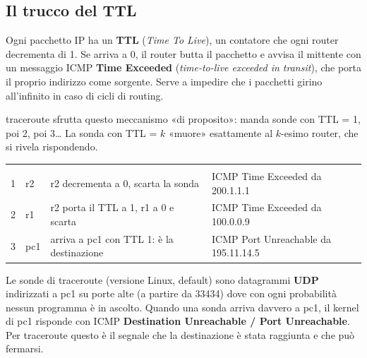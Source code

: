 \subsection{Il trucco del TTL}
\begin{intuizione}
Ogni pacchetto IP ha un \textbf{TTL} (\emph{Time To Live}), un contatore che ogni router decrementa di 1. Se arriva a 0, il router butta il pacchetto e avvisa il mittente con un messaggio ICMP \textbf{Time Exceeded} (\emph{time-to-live exceeded in transit}), che porta il proprio indirizzo come sorgente. Serve a impedire che i pacchetti girino all'infinito in caso di cicli di routing.

traceroute sfrutta questo meccanismo «di proposito»: manda sonde con TTL = 1, poi 2, poi 3\dots{} La sonda con TTL = $k$ «muore» esattamente al $k$-esimo router, che si rivela rispondendo.
\end{intuizione}
\begin{center}
\begin{tabularx}{\linewidth}{c l Y l}
 &  &  & \\
1 & r2 & r2 decrementa a 0, scarta la sonda & ICMP Time Exceeded da 200.1.1.1\\
2 & r1 & r2 porta il TTL a 1, r1 a 0 e scarta & ICMP Time Exceeded da 100.0.0.9\\
3 & pc1 & arriva a pc1 con TTL 1: è la destinazione & ICMP Port Unreachable da 195.11.14.5\\
\end{tabularx}
\end{center}
\begin{tecnica}
Le sonde di traceroute (versione Linux, default) sono datagrammi \textbf{UDP} indirizzati a pc1 su porte alte (a partire da 33434) dove con ogni probabilità nessun programma è in ascolto. Quando una sonda arriva davvero a pc1, il kernel di pc1 risponde con ICMP \textbf{Destination Unreachable / Port Unreachable}. Per traceroute questo è il segnale che la destinazione è stata raggiunta e che può fermarsi.
\end{tecnica}

